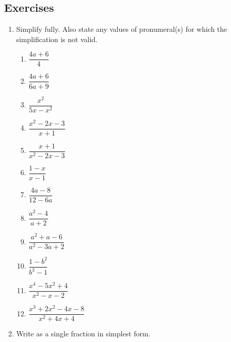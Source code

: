 \documentclass[11pt,a4paper,twoside]{article}
\begin{document}
\subsection*{Exercises}
\begin{enumerate}
\item   Simplify fully. Also state any values of pronumeral(s) for which the simplification is not valid.
        \begin{multicols}{3}
        \begin{enumerate}
        \item	$\dfrac{4a + 6}{4}$
        \item	$\dfrac{4a + 6}{6a + 9}$
        \item	$\dfrac{x^2}{5x - x^2}$
        \item	$\dfrac{x^2 - 2x - 3}{x +1}$
        \item	$\dfrac{x + 1}{x^2 - 2x - 3}$
        \item	$\dfrac{1 - x}{x - 1}$
        \item	$\dfrac{4a - 8}{12 - 6a}$
        \item	$\dfrac{a^2 - 4}{a + 2}$
        \item	$\dfrac{a^2 + a - 6}{a^2 - 3a + 2}$
        \item	$\dfrac{1 - b^2}{b^3 - 1}$
        \item	$\dfrac{x^4 - 5x^2 + 4}{x^2 - x - 2}$
        \item	$\dfrac{x^3 + 2x^2 - 4x - 8}{x^2 + 4x + 4}$
        \end{enumerate}
        \end{multicols}
\item   Write as a single fraction in simplest form.
        \begin{enumerate}
\end{enumerate}
\end{enumerate}
\end{document}
